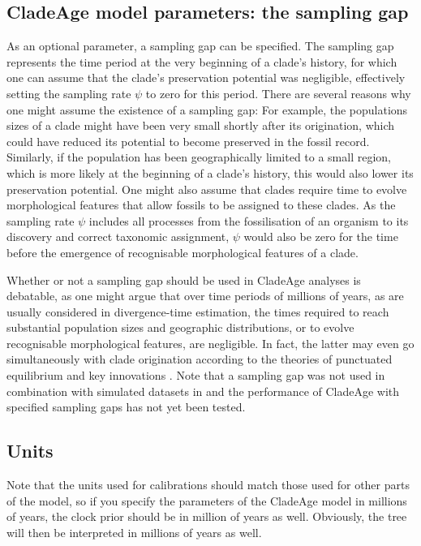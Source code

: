 \documentclass{article}
\begin{document}
\subsection{CladeAge model parameters: the sampling gap}\label{sampling_gap}

As an optional parameter, a sampling gap can be specified. The sampling gap represents the time period at the very beginning of a clade's history, for which one can assume that the clade's preservation potential was negligible, effectively setting the sampling rate $\psi$ to zero for this period. There are several reasons why one might assume the existence of a sampling gap: For example, the populations sizes of a clade might have been very small shortly after its origination, which could have reduced its potential to become preserved in the fossil record. Similarly, if the population has been geographically limited to a small region, which is more likely at the beginning of a clade's history, this would also lower its preservation potential. One might also assume that clades require time to evolve morphological features that allow fossils to be assigned to these clades. As the sampling rate $\psi$ includes all processes from the fossilisation of an organism to its discovery and correct taxonomic assignment, $\psi$ would also be zero for the time before the emergence of recognisable morphological features of a clade.

Whether or not a sampling gap should be used in CladeAge analyses is debatable, as one might argue that over time periods of millions of years, as are usually considered in divergence-time estimation, the times required to reach substantial population sizes and geographic distributions, or to evolve recognisable morphological features, are negligible. In fact, the latter may even go simultaneously with clade origination according to the theories of punctuated equilibrium and key innovations \citep{Pennell:2013ij,Rabosky:2013by}. Note that a sampling gap was not used in combination with simulated datasets in \citet{Matschiner:2016ga} and the performance of CladeAge with specified sampling gaps has not yet been tested.

\subsection{Units}

Note that the units used for calibrations should match those used for other parts of the model, so if you specify the parameters of the CladeAge model in millions of years, the clock prior should be in million of years as well. Obviously, the tree will then be interpreted in millions of years as well.
\end{document}

